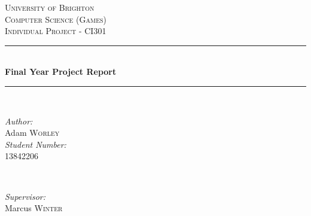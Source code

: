 \begin{titlepage}

\newcommand{\HRule}{\rule{\linewidth}{0.5mm}} %

\center %


\textsc{\LARGE University of Brighton}\\[1.5cm] %
\textsc{\Large Computer Science (Games)}\\[0.5cm] %
\textsc{\large Individual Project - CI301}\\[0.5cm] %


\HRule \\[0.4cm]
{ \huge \bfseries Final Year Project Report}\\[0.4cm] %
\HRule \\[1.5cm]


\begin{minipage}{0.4\textwidth}
\begin{flushleft} \large
\emph{Author:}\\
Adam \textsc{Worley}\\ %
\emph{Student Number:}\\
13842206
\end{flushleft}
\end{minipage}
~
\begin{minipage}{0.4\textwidth}
\begin{flushright} \large
\emph{Supervisor:} \\
Marcus \textsc{Winter} %
\end{flushright}
\end{minipage}\\[3cm]


\end{titlepage}
